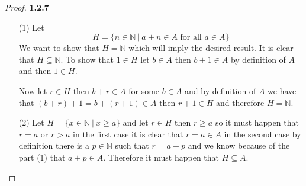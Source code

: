 \documentclass[11pt]{article}
\newcommand{\N}{\mathbb{N}}
\theoremstyle{definition}
\begin{document}
    \begin{proof}{\textbf{1.2.7}}
        \begin{itemize}
        \item [(1)] Let
        $$H = \{n \in \N ~|~ a+n \in A \text{ for all }a\in A\}$$
        We want to show that $H = \N$ which will imply the desired result. It 
        is clear that $H\subseteq\N$. To show that $1 \in H$ let $b \in A$ then
        $b + 1 \in A$ by definition of $A$ and then $1 \in H$.

        Now let $r \in H$ then $b + r \in A$ for some $b \in A$ and by
        definition of $A$ we have that $(b + r) + 1 = b + (r + 1)\in A$ then
        $r +1 \in H$ and therefore $H = \N$.
        \item [(2)] Let $H = \{x \in \N ~|~ x \geq a\}$ and let $r \in H$ then
        $r \geq a$ so it must happen that $r = a$ or $r > a $ in the first
        case it is clear that $r = a \in A$ in the second case by definition
        there is a $p \in \N$ such that $r = a + p$ and we know because of the
        part (1) that $a + p \in A$. Therefore it must happen that
        $H \subseteq A$.
        \end{itemize}
    \end{proof}
\end{document}
